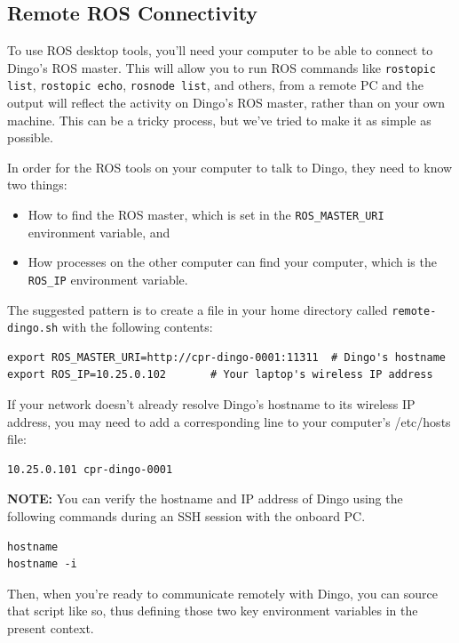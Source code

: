 \documentclass[]{clearpath-latex/clearpath-manual}
\begin{document}
\subsection{Remote ROS Connectivity}\label{remote}

To use ROS desktop tools, you’ll need your computer to be able to connect to Dingo’s ROS master. This will allow you to run ROS commands like \lstinline{rostopic list}, \lstinline{rostopic echo}, \lstinline{rosnode list}, and others, from a remote PC and the output will reflect the activity on Dingo’s ROS master, rather than on your own machine.  This can be a tricky process, but we’ve tried to make it as simple as possible.

In order for the ROS tools on your computer to talk to Dingo, they need to know two things:

\begin{itemize}[nolistsep]
  \item How to find the ROS master, which is set in the \lstinline{ROS_MASTER_URI} environment variable, and
  \item How processes on the other computer can find your computer, which is the \lstinline{ROS_IP} environment variable.
\end{itemize}

The suggested pattern is to create a file in your home directory called \lstinline{remote-dingo.sh} with the following contents:

\begin{lstlisting}
export ROS_MASTER_URI=http://cpr-dingo-0001:11311  # Dingo's hostname
export ROS_IP=10.25.0.102       # Your laptop's wireless IP address
\end{lstlisting}

If your network doesn’t already resolve Dingo’s hostname to its wireless IP address, you may need to add a corresponding line to your computer’s /etc/hosts file:

\begin{lstlisting}
10.25.0.101 cpr-dingo-0001
\end{lstlisting}

\textbf{NOTE:} You can verify the hostname and IP address of Dingo using the following commands during an SSH session with the onboard PC.

\begin{lstlisting}
hostname
hostname -i
\end{lstlisting}

Then, when you’re ready to communicate remotely with Dingo, you can source that script like so, thus defining those two key environment variables in the present context.
\end{document}
